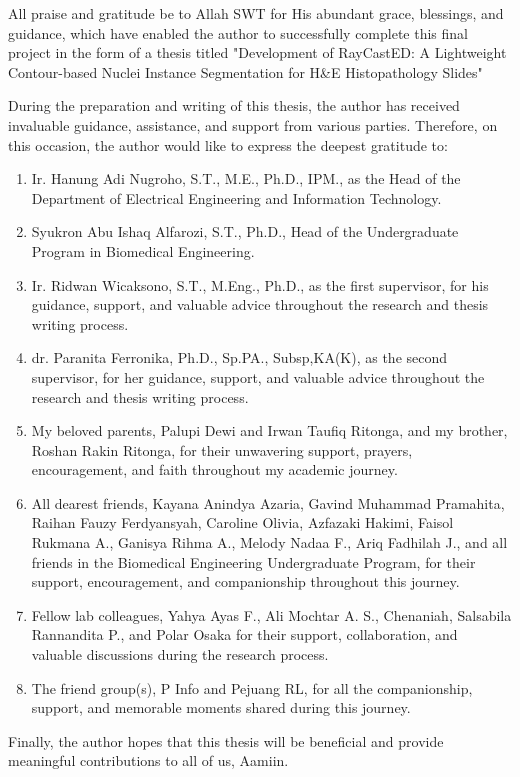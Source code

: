 All praise and gratitude be to Allah SWT for His abundant grace, blessings, and guidance, which have enabled the author to successfully complete this final project in the form of a thesis titled "Development of RayCastED: A Lightweight Contour-based Nuclei Instance Segmentation for H\&E Histopathology Slides"

During the preparation and writing of this thesis, the author has received invaluable guidance, assistance, and support from various parties. Therefore, on this occasion, the author would like to express the deepest gratitude to:
\begin{enumerate}
	\item Ir. Hanung Adi Nugroho, S.T., M.E., Ph.D., IPM., as the Head of the Department of Electrical Engineering and Information Technology.
	
	\item Syukron Abu Ishaq Alfarozi, S.T., Ph.D., Head of the Undergraduate Program in Biomedical Engineering.
		
	\item Ir. Ridwan Wicaksono, S.T., M.Eng., Ph.D., as the first supervisor, for his guidance, support, and valuable advice throughout the research and thesis writing process.

	\item dr. Paranita Ferronika, Ph.D., Sp.PA., Subsp,KA(K), as the second supervisor, for her guidance, support, and valuable advice throughout the research and thesis writing process.

	\item My beloved parents, Palupi Dewi and Irwan Taufiq Ritonga, and my brother, Roshan Rakin Ritonga, for their unwavering support, prayers, encouragement, and faith throughout my academic journey.

	\item All dearest friends, Kayana Anindya Azaria, Gavind Muhammad Pramahita, Raihan Fauzy Ferdyansyah, Caroline Olivia, Azfazaki Hakimi, Faisol Rukmana A., Ganisya Rihma A., Melody Nadaa F., Ariq Fadhilah J., and all friends in the Biomedical Engineering Undergraduate Program, for their support, encouragement, and companionship throughout this journey.

	\item Fellow lab colleagues, Yahya Ayas F., Ali Mochtar A. S., Chenaniah, Salsabila Rannandita P., and Polar Osaka for their support, collaboration, and valuable discussions during the research process.

	\item The friend group(s), P Info and Pejuang RL, for all the companionship, support, and memorable moments shared during this journey.

\end{enumerate}

Finally, the author hopes that this thesis will be beneficial and provide meaningful contributions to all of us, Aamiin.

